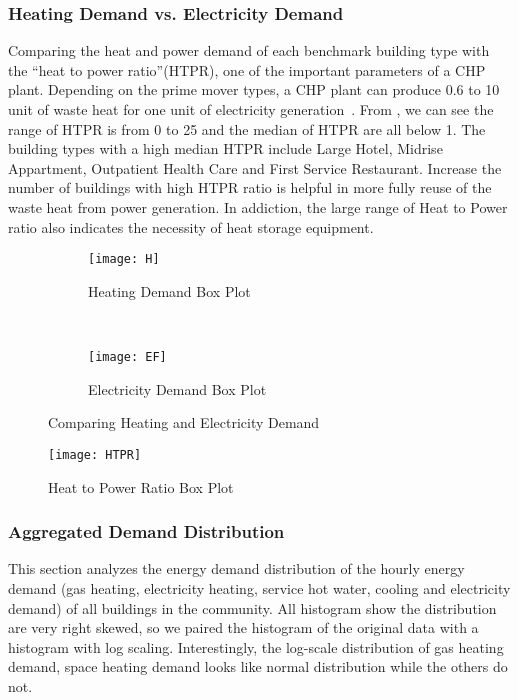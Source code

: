 \subsubsection{Heating Demand vs. Electricity Demand}
Comparing the heat and power demand of each benchmark building type
with the ``heat to power ratio''(HTPR), one of the important
parameters of a CHP plant. Depending on the prime mover types, a CHP
plant can produce 0.6 to 10 unit of waste heat for one unit of
electricity generation~\cite{introCHP2010}. From , we
can see the range of HTPR is from 0 to 25 and the median of HTPR are
all below 1. The building types with a high median HTPR include Large
Hotel, Midrise Appartment, Outpatient Health Care and First Service
Restaurant. Increase the number of buildings with high HTPR ratio is
helpful in more fully reuse of the waste heat from power
generation. In addiction, the large range of Heat to Power ratio also
indicates the necessity of heat storage equipment.
\begin{figure}[h!]
  \centering
  \begin{subfigure}{0.4\textwidth}
  \centering
  \texttt{[image: H]}
  \caption[Heating Demand Box Plot]{Heating Demand Box
    Plot}
  \label{fig:H}
\end{subfigure}
~
\begin{subfigure}{0.4\textwidth}
  \centering
  \texttt{[image: EF]}
  \caption[Electricity Demand Box Plot]{Electricity Demand Box Plot}
  \label{fig:EF2}
\end{subfigure}
\caption[Comparing Heating and Electricity Demand]{Comparing Heating
  and Electricity Demand}
\end{figure}

\begin{figure}[h!]
  \centering
  \texttt{[image: HTPR]}
  \caption[Heat to Power Ratio Box Plot]{Heat to Power Ratio Box Plot}
  \label{fig:HTPR}
\end{figure}%

\subsubsection{Aggregated Demand Distribution}
This section analyzes the energy demand distribution of the hourly
energy demand (gas heating, electricity heating, service hot water,
cooling and electricity demand) of all buildings in the community. All
histogram show the distribution are very right skewed, so we paired
the histogram of the original data with a histogram with log
scaling. Interestingly, the log-scale distribution of gas heating
demand, space heating demand looks like normal distribution while the
others do not.


